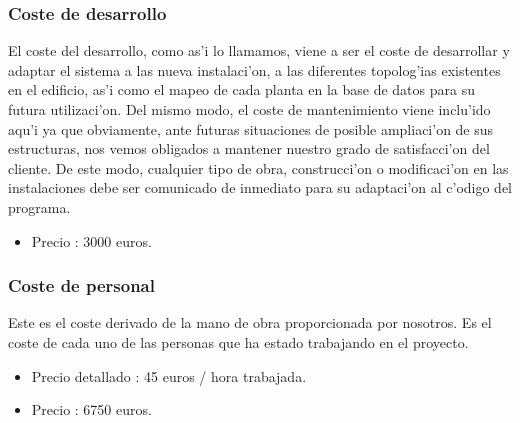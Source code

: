 \subsubsection{Coste de desarrollo}
El coste del desarrollo, como as'i lo llamamos, viene a ser el coste de desarrollar y adaptar el sistema a las nueva instalaci'on, a las diferentes
topolog'ias existentes en el edificio, as'i como el mapeo de cada planta en la base de datos para su futura utilizaci'on. Del mismo modo, el coste
de mantenimiento viene inclu'ido aqu'i ya que obviamente, ante futuras situaciones de posible ampliaci'on de sus estructuras, nos vemos
obligados a mantener nuestro grado de satisfacci'on del cliente. De este modo, cualquier tipo de obra, construcci'on o modificaci'on 
en las instalaciones debe ser comunicado de inmediato para su adaptaci'on al c'odigo del programa.
\begin{itemize}
\item Precio : 3000 euros.
\end{itemize}

\subsubsection{Coste de personal}
Este es el coste derivado de la mano de obra proporcionada por nosotros. Es el coste de cada uno de las personas que ha estado 
trabajando en el proyecto.
\begin{itemize}
\item Precio detallado : 45 euros / hora trabajada.
\item Precio : 6750 euros.

\end{itemize}



